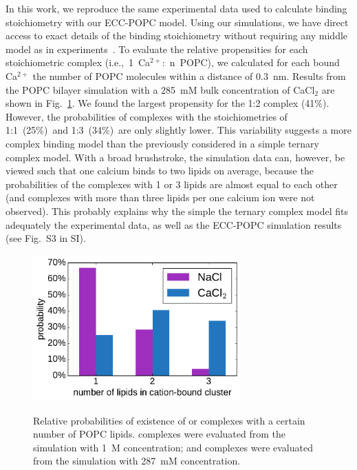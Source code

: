 \documentclass[aip,jcp,twocolumn]{revtex4}
\begin{document}
In this work, we reproduce the same experimental data used to calculate binding stoichiometry with our ECC-POPC model. Using our simulations, we have direct access to exact details of the binding stoichiometry without requiring any middle model as in experiments~\cite{altenbach84, macdonald87}. To evaluate the relative propensities for each stoichiometric complex (i.e.,~1~Ca$^{2+}$:~n~POPC), we calculated for each bound Ca$^{2+}$ the number of POPC molecules within a distance of 0.3~nm.
Results from the POPC bilayer simulation with a 285~mM bulk concentration of CaCl$_2$ are shown in Fig.~\ref{fig:cacl_complexes}.
We found the largest propensity for the 1:2 complex (41\%).
However, the probabilities of complexes with the stoichiometries of 1:1~(25\%)~and 1:3~(34\%)~are only slightly lower. This variability suggests a more complex binding model than the previously considered in a simple ternary complex model. With a broad brushstroke, the simulation data can, however, be viewed such that one calcium binds to two lipids on average, because the probabilities of the complexes with 1 or 3 lipids are almost equal to each other  (and complexes with more than three lipids per one calcium ion were not observed). This probably explains why the simple the ternary complex model fits adequately the experimental data, as well as the ECC-POPC simulation results (see Fig.~S3 in SI).

\begin{figure}[tb!]
  \centering
  \includegraphics[width=8.0cm]{../Fig/ipython_nb/stoichiometry_NaCl-CaCl2_comparison_Ecc-lipids.pdf} \\
  \caption{\label{fig:cacl_complexes}
      Relative probabilities of existence of  or  complexes
      with a certain number of POPC lipids. 
       complexes were evaluated from the simulation with 1~M concentration;
      and  complexes were evaluated from the simulation with 287~mM concentration.
  }
\end{figure}
\end{document}
